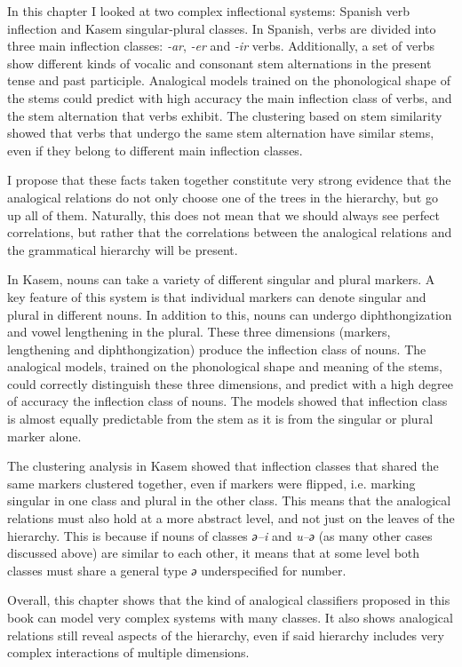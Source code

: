 In this chapter I looked at two complex inflectional systems: Spanish verb inflection and Kasem singular-plural classes. In Spanish, verbs are divided into three main inflection classes: \textit{-ar}, \textit{-er} and \textit{-ir} verbs. Additionally, a set of verbs show different kinds of vocalic and consonant stem alternations in the present tense and past participle. Analogical models trained on the phonological shape of the stems could predict with high accuracy the main inflection class of verbs, and the stem alternation that verbs exhibit. The clustering based on stem similarity showed that verbs that undergo the same stem alternation have similar stems, even if they belong to different main inflection classes.

I propose that these facts taken together constitute very strong evidence that the analogical relations do not only choose one of the trees in the hierarchy, but go up all of them. Naturally, this does not mean that we should always see perfect correlations, but rather that the correlations between the analogical relations and the grammatical hierarchy will be present.

In Kasem, nouns can take a variety of different singular and plural markers. A key feature of this system is that individual markers can denote singular and plural in different nouns. In addition to this, nouns can undergo diphthongization and vowel lengthening in the plural. These three dimensions (markers, lengthening and diphthongization) produce the inflection class of nouns. The analogical models, trained on the phonological shape and meaning of the stems, could correctly distinguish these three dimensions, and predict with a high degree of accuracy the inflection class of nouns. The models showed that inflection class is almost equally predictable from the stem as it is from the singular or plural marker alone.

\newpage 
The clustering analysis in Kasem showed that inflection classes that shared the same markers clustered together, even if markers were flipped, i.e. marking singular in one class and plural in the other class. This means that the analogical relations must also hold at a more abstract level, and not just on the leaves of the hierarchy. This is because if nouns of classes \textit{ә--i} and \textit{u--ә} (as many other cases discussed above) are similar to each other, it means that at some level both classes must share a general type \textit{ә} underspecified for number.

Overall, this chapter shows that the kind of analogical classifiers proposed in this book can model very complex systems with many classes. It also shows analogical relations still reveal aspects of the hierarchy, even if said hierarchy includes very complex interactions of multiple dimensions. 


